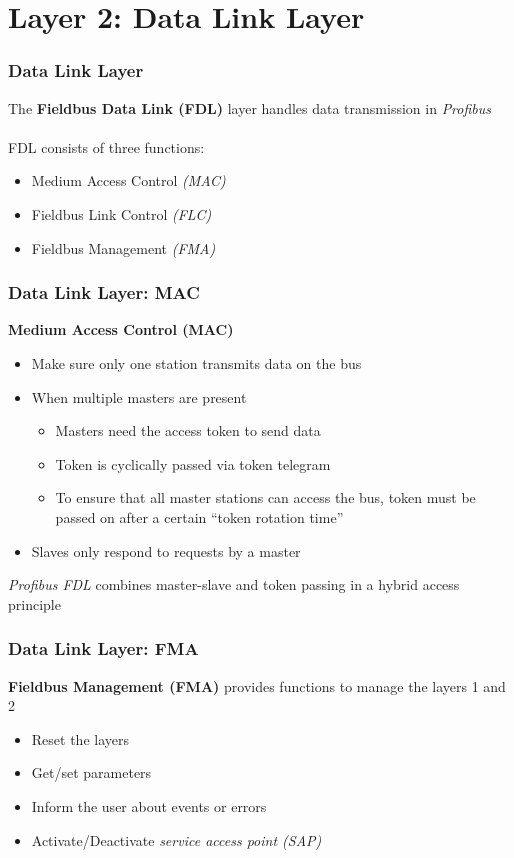 \documentclass{beamer}
\begin{document}
\section{Layer 2: Data Link Layer}
\begin{frame}
  \frametitle{Data Link Layer}
  The \textbf{Fieldbus Data Link (FDL)} layer handles data transmission in
  \textit{Profibus} \\
  \hfill \\
  FDL consists of three functions:
  \begin{itemize}
    \item Medium Access Control \textit{(MAC)}
    \item Fieldbus Link Control \textit{(FLC)}
    \item Fieldbus Management \textit{(FMA)}
  \end{itemize}
\end{frame}

\begin{frame}
  \frametitle{Data Link Layer: MAC}
  \textbf{Medium Access Control (MAC)}
  \begin{itemize}
    \item Make sure only one station transmits data on the bus
    \item When multiple masters are present
      \begin{itemize}
        \item Masters need the access token to send data
        \item Token is cyclically passed via token telegram
        \item To ensure that all master stations can access the bus, token must be passed
          on after a certain ``token rotation time''
      \end{itemize}
    \item Slaves only respond to requests by a master
  \end{itemize}
  \textit{Profibus FDL} combines master-slave and token passing in a hybrid access principle
\end{frame}

\begin{frame}
  \frametitle{Data Link Layer: FMA}
  \textbf{Fieldbus Management (FMA)} provides functions to manage the layers 1 and 2
    \begin{itemize}
      \item Reset the layers
      \item Get/set parameters
      \item Inform the user about events or errors
      \item Activate/Deactivate \textit{service access point (SAP)}
    \end{itemize}
\end{frame}
\end{document}
